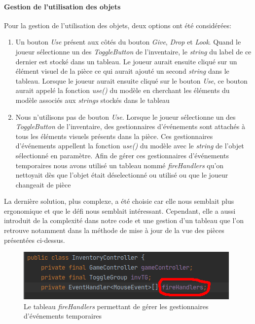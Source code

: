 \documentclass[./standalone.tex]{subfiles}
\begin{document}
\paragraph{Gestion de l'utilisation des objets\\}

Pour la gestion de l'utilisation des objets, deux options ont été considérées:
\begin{enumerate}
	\item Un bouton \textit{Use} présent aux côtés du bouton \textit{Give}, \textit{Drop} et \textit{Look}. Quand le joueur sélectionne un des \textit{ToggleButton} de l'inventaire, le \textit{string} du label de ce dernier est stocké dans un tableau. Le joueur aurait ensuite cliqué sur un élément visuel de la pièce ce qui aurait ajouté un second \textit{string} dans le tableau. Lorsque le joueur aurait ensuite cliqué sur le bouton \textit{Use}, ce bouton aurait appelé la fonction \textit{use()} du modèle en cherchant les éléments du modèle associés aux \textit{strings} stockés dans le tableau
	\item Nous n'utilisons pas de bouton \textit{Use}. Lorsque le joueur sélectionne un des \textit{ToggleButton} de l'inventaire, des gestionnaires d'événements sont attachés à tous les éléments visuels présents dans la pièce. Ces gestionnaires d'événements appellent la fonction \textit{use()} du modèle avec le \textit{string} de l'objet sélectionné en paramètre. Afin de gérer ces gestionnaires d'événements temporaires nous avons utilisé un tableau nommé \textit{fireHandlers} qu'on nettoyait dès que l'objet était déselectionné ou utilisé ou que le joueur changeait de pièce\\
\end{enumerate}

La dernière solution, plus complexe, a été choisie car elle nous semblait plus ergonomique et que le défi nous semblait intéressant. Cependant, elle a aussi introduit de la complexité dans notre code et une gestion d'un tableau que l'on retrouve notamment dans la méthode de mise à jour de la vue des pièces présentées ci-dessus.
\begin{center}
	\begin{figure}[h!]
	\includegraphics[scale=1]{images/fireHandlers.png}
	\caption{Le tableau \textit{fireHandlers} permettant de gérer les gestionnaires d'événements temporaires}
	\end{figure}
\end{center}
\end{document}
